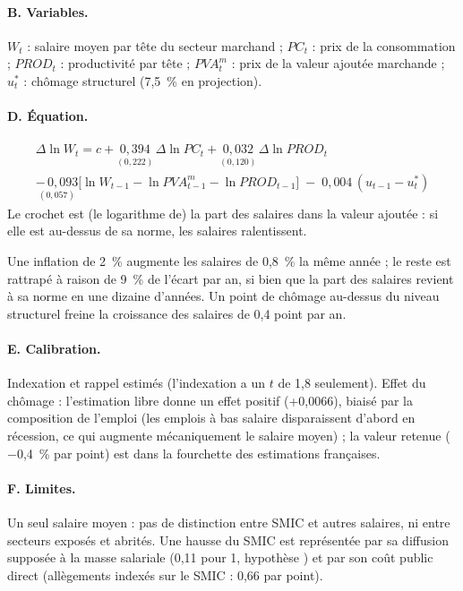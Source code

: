 \paragraph{B. Variables.} $W_t$ : salaire moyen par tête du secteur marchand ; $PC_t$ : prix de la consommation ;
$PROD_t$ : productivité par tête ; $PVA^m_t$ : prix de la valeur ajoutée marchande ; $u^*_t$ : chômage structurel
(7,5~\% en projection).

\paragraph{D. Équation.}
\begin{multline}
\Delta\ln W_t = c + \underset{(0{,}222)}{0{,}394}\,\Delta\ln PC_t + \underset{(0{,}120)}{0{,}032}\,\Delta\ln PROD_t \\
\underset{(0{,}057)}{-\,0{,}093}\bigl[\ln W_{t-1} - \ln PVA^m_{t-1} - \ln PROD_{t-1}\bigr] \;-\; 0{,}004\,(u_{t-1}-u^*_t)
\end{multline}
Le crochet est (le logarithme de) la part des salaires dans la valeur ajoutée : si elle est au-dessus de sa norme, les
salaires ralentissent.

\begin{exemple}
Une inflation de 2~\% augmente les salaires de 0,8~\% la même année ; le reste est rattrapé à raison de 9~\% de l'écart
par an, si bien que la part des salaires revient à sa norme en une dizaine d'années. Un point de chômage au-dessus du
niveau structurel freine la croissance des salaires de 0,4 point par an.
\end{exemple}

\paragraph{E. Calibration.} Indexation et rappel estimés  (l'indexation a un $t$ de 1,8 seulement).
Effet du chômage  : l'estimation libre donne un effet positif (+0,0066), biaisé par la composition de
l'emploi (les emplois à bas salaire disparaissent d'abord en récession, ce qui augmente mécaniquement le salaire
moyen) ; la valeur retenue ($-$0,4~\% par point) est dans la fourchette des estimations françaises.

\paragraph{F. Limites.} Un seul salaire moyen : pas de distinction entre SMIC et autres salaires, ni entre secteurs
exposés et abrités. Une hausse du SMIC est représentée par sa diffusion supposée à la masse salariale (0,11 pour 1,
hypothèse ) et par son coût public direct (allègements indexés sur le SMIC : 0,66\md{} par point).


